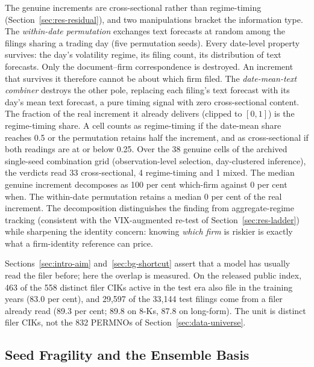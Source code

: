 The genuine increments are cross-sectional rather than regime-timing (Section~\ref{sec:res-residual}), and two manipulations bracket the information type. The \emph{within-date permutation} exchanges text forecasts at random among the filings sharing a trading day (five permutation seeds). Every date-level property survives: the day's volatility regime, its filing count, its distribution of text forecasts. Only the document--firm correspondence is destroyed. An increment that survives it therefore cannot be about which firm filed. %
The \emph{date-mean-text combiner} destroys the other pole, replacing each filing's text forecast with its day's mean text forecast, a pure timing signal with zero cross-sectional content. The fraction of the real increment it already delivers (clipped to $[0,1]$) is the regime-timing share. %
A cell counts as regime-timing if the date-mean share reaches 0.5 or the permutation retains half the increment, and as cross-sectional if both readings are at or below 0.25. %
Over the 38 genuine cells of the archived single-seed combination grid (observation-level selection, day-clustered inference), the verdicts read 33 cross-sectional, 4 regime-timing and 1 mixed. The median genuine increment decomposes as 100 per cent which-firm against 0 per cent when. The within-date permutation retains a median 0 per cent of the real increment. %
The decomposition distinguishes the finding from aggregate-regime tracking (consistent with the VIX-augmented re-test of Section~\ref{sec:res-ladder}) while sharpening the identity concern: knowing \emph{which firm} is riskier is exactly what a firm-identity reference can price.

Sections~\ref{sec:intro-aim} and~\ref{sec:bg-shortcut} assert that a model has usually read the filer before; here the overlap is measured. On the released public index, 463 of the 558 distinct filer CIKs active in the test era also file in the training years (83.0 per cent), and 29{,}597 of the 33{,}144 test filings come from a filer already read (89.3 per cent; 89.8 on 8-Ks, 87.8 on long-form). %
The unit is distinct filer CIKs, not the 832 PERMNOs of Section~\ref{sec:data-universe}.

\subsection{Seed Fragility and the Ensemble Basis}
\label{sec:val-seeds}

